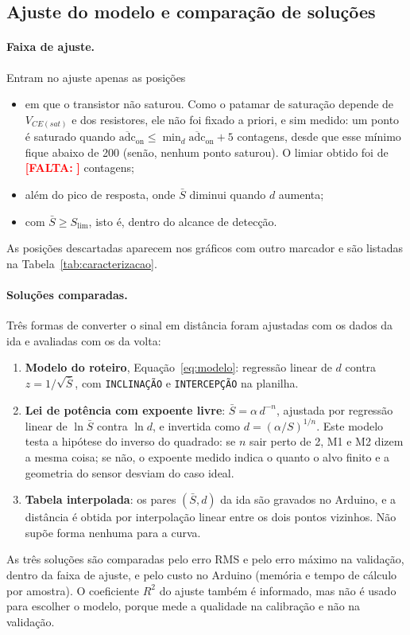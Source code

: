 \documentclass[11pt,a4paper]{article}
\newcommand{\pendente}[1]{\textcolor{red}{\textbf{[FALTA:} #1\textbf{]}}}
\begin{document}
\subsection{Ajuste do modelo e comparação de soluções}
\label{sec:met-ajuste}

\paragraph{Faixa de ajuste.} Entram no ajuste apenas as posições
\begin{itemize}[nosep]
  \item em que o transistor não saturou. Como o patamar de saturação depende de $V_{CE(sat)}$ e dos resistores, ele não foi fixado a priori, e sim medido: um ponto é saturado quando $\overline{\text{adc}}_\text{on} \le \min_d \overline{\text{adc}}_\text{on} + 5$ contagens, desde que esse mínimo fique abaixo de 200 (senão, nenhum ponto saturou). O limiar obtido foi de \pendente{} contagens;
  \item além do pico de resposta, onde $\bar{S}$ diminui quando $d$ aumenta;
  \item com $\bar{S} \ge S_\text{lim}$, isto é, dentro do alcance de detecção.
\end{itemize}
As posições descartadas aparecem nos gráficos com outro marcador e são listadas na Tabela~\ref{tab:caracterizacao}.

\paragraph{Soluções comparadas.} Três formas de converter o sinal em distância foram ajustadas com os dados da ida e avaliadas com os da volta:
\begin{enumerate}[label=\textbf{M\arabic*}, nosep]
  \item \textbf{Modelo do roteiro}, Equação~\eqref{eq:modelo}: regressão linear de $d$ contra $z = 1/\sqrt{\bar{S}}$, com \texttt{INCLINAÇÃO} e \texttt{INTERCEPÇÃO} na planilha.
  \item \textbf{Lei de potência com expoente livre}: $\bar{S} = \alpha\, d^{-n}$, ajustada por regressão linear de $\ln \bar{S}$ contra $\ln d$, e invertida como $d = (\alpha/S)^{1/n}$. Este modelo testa a hipótese do inverso do quadrado: se $n$ sair perto de 2, M1 e M2 dizem a mesma coisa; se não, o expoente medido indica o quanto o alvo finito e a geometria do sensor desviam do caso ideal.
  \item \textbf{Tabela interpolada}: os pares $(\bar{S}, d)$ da ida são gravados no Arduino, e a distância é obtida por interpolação linear entre os dois pontos vizinhos. Não supõe forma nenhuma para a curva.
\end{enumerate}
As três soluções são comparadas pelo erro RMS e pelo erro máximo na validação, dentro da faixa de ajuste, e pelo custo no Arduino (memória e tempo de cálculo por amostra). O coeficiente $R^2$ do ajuste também é informado, mas não é usado para escolher o modelo, porque mede a qualidade na calibração e não na validação.
\end{document}
